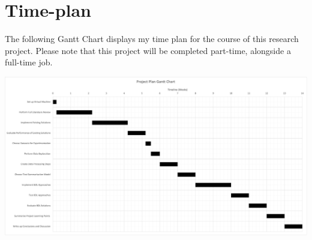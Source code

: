 \documentclass[ %
                    author={James Stephenson},
                supervisor={Dr. Edwin Simpson},
                    degree={MSc},
                     title={PROJECT PLAN},
                  subtitle={Bayesian Deep Learning For Extractive Test Summarisation},
                      type={},
                      year={2022}]{../additions/dissertation}
\begin{document}
	
	
	
	\backmatter
	
	
	
	
	
	\appendix
	
	\chapter{Time-plan}
		\label{appx:timeplan}
		
		The following Gantt Chart displays my time plan for the course of this research project. Please note that this project will be completed part-time, alongside a full-time job.
		\bigbreak
		
		\begin{center}
			\includegraphics[width=\textwidth,height=\textheight,keepaspectratio]{Gantt.png}
		\end{center}
		
\end{document}
